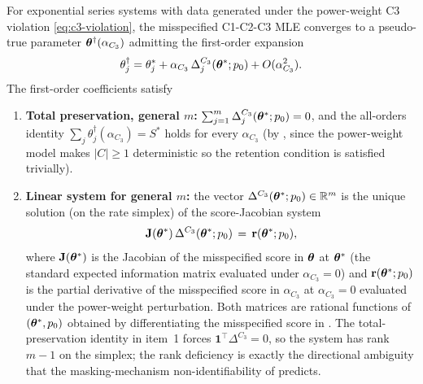 \begin{theorem}
\label{thm:misspec-C3}
For exponential series systems with data generated under the power-weight
C3 violation \eqref{eq:c3-violation}, the misspecified C1-C2-C3 MLE
converges to a pseudo-true parameter $\bm{\theta}^\dagger(\alpha_{C_3})$
admitting the first-order expansion
\begin{equation}
\label{eq:c3-expansion}
    \theta_j^\dagger = \theta_j^* +
        \alpha_{C_3}\, \Delta_j^{C_3}(\bm{\theta}^*; p_0) +
        O(\alpha_{C_3}^2).
\end{equation}
The first-order coefficients satisfy
\begin{enumerate}
    \item \textbf{Total preservation, general $m$:}
        $\sum_{j=1}^m \Delta_j^{C_3}(\bm{\theta}^*; p_0) = 0$, and the
        all-orders identity $\sum_j \theta_j^\dagger(\alpha_{C_3}) = S^*$
        holds for every $\alpha_{C_3}$ (by ,
        since the power-weight model makes $|C| \geq 1$ deterministic so
        the retention condition is satisfied trivially).
    \item \textbf{Linear system for general $m$:} the vector
        $\Delta^{C_3}(\bm{\theta}^*; p_0) \in \mathbb{R}^m$ is the unique
        solution (on the rate simplex) of the score-Jacobian system
        \begin{equation}
        \label{eq:c3-linsys}
            \mathbf{J}(\bm{\theta}^*)\, \Delta^{C_3}(\bm{\theta}^*; p_0)
                \,=\, \mathbf{r}(\bm{\theta}^*; p_0),
        \end{equation}
        where $\mathbf{J}(\bm{\theta}^*)$ is the Jacobian of the misspecified
        score in $\bm{\theta}$ at $\bm{\theta}^*$ (the standard expected
        information matrix evaluated under $\alpha_{C_3} = 0$) and
        $\mathbf{r}(\bm{\theta}^*; p_0)$ is the partial derivative of the
        misspecified score in $\alpha_{C_3}$ at $\alpha_{C_3} = 0$
        evaluated under the power-weight perturbation. Both matrices are
        rational functions of $(\bm{\theta}^*, p_0)$ obtained by
        differentiating the misspecified score in
        . The total-preservation identity in item~1
        forces $\mathbf{1}^\top \Delta^{C_3} = 0$, so the system has rank
        $m - 1$ on the simplex; the rank deficiency is exactly the
        directional ambiguity that the masking-mechanism non-identifiability
        of  predicts.
\end{enumerate}
\end{theorem}

